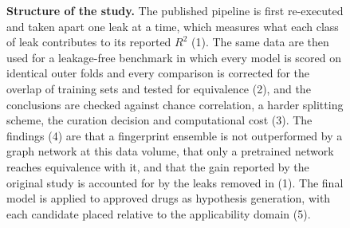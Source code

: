 \begin{figure}[!htbp]
{%
	}
	\caption{\textbf{Structure of the study.} The published pipeline is first re-executed and taken apart one leak at a
		time, which measures what each class of leak contributes to its reported $R^2$ (1). The same data are then used
		for a leakage-free benchmark in which every model is scored on identical outer folds and every comparison is
		corrected for the overlap of training sets and tested for equivalence (2), and the conclusions are checked
		against chance correlation, a harder splitting scheme, the curation decision and computational cost (3). The
		findings (4) are that a fingerprint ensemble is not outperformed by a graph network at this data volume, that
		only a pretrained network reaches equivalence with it, and that the gain reported by the original study is
		accounted for by the leaks removed in (1). The final model is applied to approved drugs as hypothesis
		generation, with each candidate placed relative to the applicability domain (5).}
	\label{fig:pipeline_flowchart}
	\vspace{-10pt}
\end{figure}
